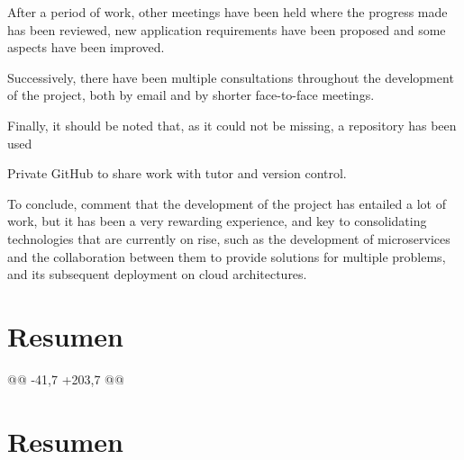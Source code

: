 After a period of work, other meetings have been held where the progress made has been reviewed, new application requirements have been proposed and some aspects have been improved.

Successively, there have been multiple consultations throughout the development of the project, both by email and by shorter face-to-face meetings.

Finally, it should be noted that, as it could not be missing, a repository has been used

Private GitHub to share work with tutor and version control.

To conclude, comment that the development of the project has entailed a lot of work, but it has been a very rewarding experience, and key to consolidating technologies that are currently on rise, such as the development of microservices and the collaboration between them to provide solutions for multiple problems, and its subsequent deployment on cloud architectures.

\chapter*{Resumen\label{00summary}}
	@@ -41,7 +203,7 @@ \chapter*{Resumen\label{00summary}}
